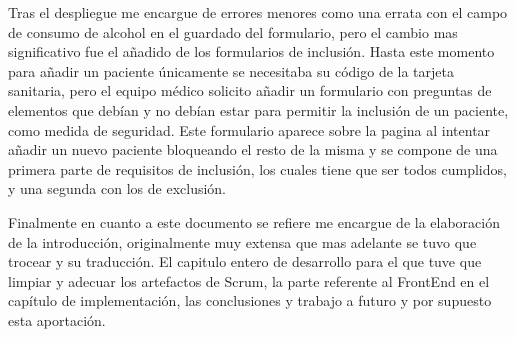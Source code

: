 Tras el despliegue me encargue de errores menores como una errata con el campo de consumo de alcohol en el guardado del formulario, pero el cambio mas significativo fue el añadido de los formularios de inclusión. Hasta este momento para añadir un paciente únicamente se necesitaba su código de la tarjeta sanitaria, pero el equipo médico solicito añadir un formulario con preguntas de elementos que debían y no debían estar para permitir la inclusión de un paciente, como medida de seguridad. Este formulario aparece sobre la pagina al intentar añadir un nuevo paciente bloqueando el resto de la misma y se compone de una primera parte de requisitos de inclusión, los cuales tiene que ser todos cumplidos, y una segunda con los de exclusión.\newline

Finalmente en cuanto a este documento se refiere me encargue de la elaboración de la introducción, originalmente muy extensa que mas adelante se tuvo que trocear y su traducción. El capitulo entero de desarrollo para el que tuve que limpiar y adecuar los artefactos de Scrum, la parte referente al FrontEnd en el capítulo de implementación, las conclusiones y trabajo a futuro y por supuesto esta aportación.

